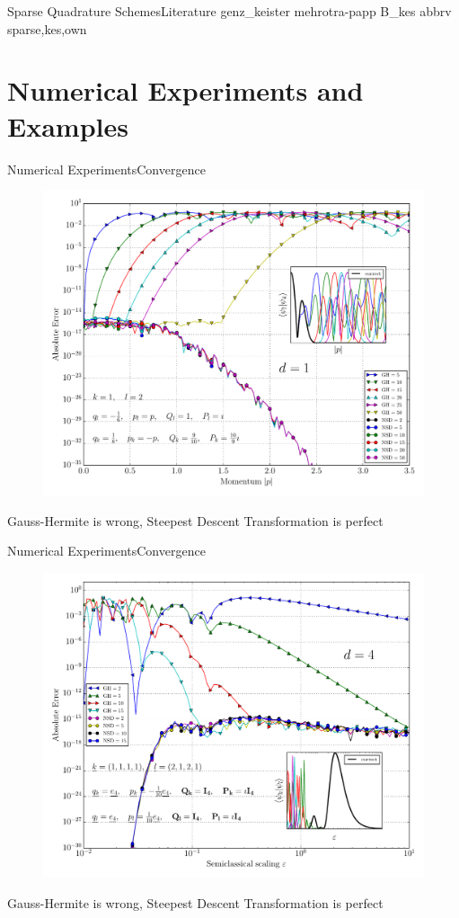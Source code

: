 \documentclass{beamer}
\begin{document}
\begin{frame}{Sparse Quadrature Schemes}{Literature}
  \nocite{sqs}{genz_keister}
  \nocite{sqs}{mehrotra-papp}
  \nocite{sqs}{B_kes}
  \scriptsize
  {abbrv}
  {sparse,kes,own}{}
\end{frame}


\section{Numerical Experiments and Examples}


\begin{frame}{Numerical Experiments}{Convergence}
  \begin{figure}
    \centering
    \includegraphics[width=0.65\linewidth]{./fig/conv_momentum.pdf}
  \end{figure}
  \scriptsize
  Gauss-Hermite is wrong, Steepest Descent Transformation is perfect
\end{frame}


\begin{frame}{Numerical Experiments}{Convergence}
  \begin{figure}
    \centering
    \includegraphics[width=0.7\linewidth]{./fig/conv_eps.pdf}
  \end{figure}
  \scriptsize
  Gauss-Hermite is wrong, Steepest Descent Transformation is perfect
\end{frame}
\end{document}
